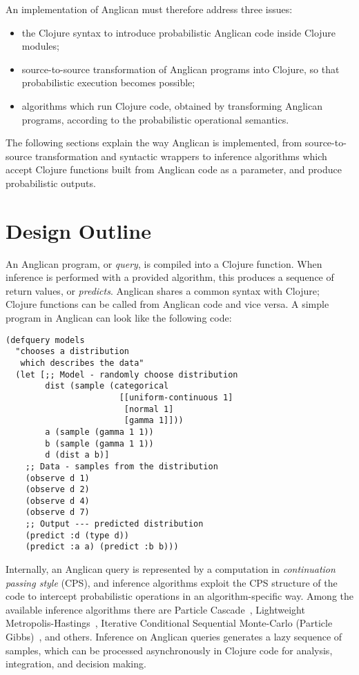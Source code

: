 \documentclass[preprint]{sigplanconf}
\begin{document}
An implementation of Anglican must therefore address three issues:
\begin{itemize}
    \item the Clojure syntax to introduce probabilistic Anglican
        code inside Clojure modules;
    \item source-to-source transformation of Anglican programs
        into Clojure, so that probabilistic execution becomes
        possible;
    \item algorithms which run Clojure code, obtained by
        transforming Anglican programs, according to the
        probabilistic operational semantics.
\end{itemize}
The following sections explain the way Anglican is implemented,
from source-to-source transformation and syntactic wrappers to
inference algorithms which accept Clojure functions built from
Anglican code as a parameter, and produce probabilistic outputs.

\section{Design Outline}


An Anglican program, or \textit{query}, is compiled into a Clojure
function. When inference is performed with a provided algorithm, this
produces a sequence of return values, or \textit{predicts}. Anglican
shares a common syntax with Clojure; Clojure functions can be called
from Anglican code and vice versa. A simple program in Anglican can
look like the following code:
\begin{lstlisting}[style=default]
(defquery models
  "chooses a distribution
   which describes the data"
  (let [;; Model - randomly choose distribution
	    dist (sample (categorical
                       [[uniform-continuous 1]
                        [normal 1] 
                        [gamma 1]]))
        a (sample (gamma 1 1))
        b (sample (gamma 1 1))
        d (dist a b)]
    ;; Data - samples from the distribution
    (observe d 1)
    (observe d 2)
    (observe d 4)
    (observe d 7)
    ;; Output --- predicted distribution
    (predict :d (type d))
    (predict :a a) (predict :b b)))
\end{lstlisting}

Internally, an Anglican query is represented by a computation in
\textit{continuation passing style} (CPS), and inference algorithms
exploit the CPS structure of the code to intercept probabilistic
operations in an algorithm-specific way. Among the available
inference algorithms there are Particle Cascade~\cite{PWD+14},
Lightweight Metropolis-Hastings~\cite{WSG11}, Iterative Conditional
Sequential Monte-Carlo (Particle Gibbs)~\cite{WVM14}, and others.
Inference on Anglican queries generates a lazy sequence of
samples, which can be processed asynchronously in Clojure
code for analysis, integration, and decision making.
\end{document}
